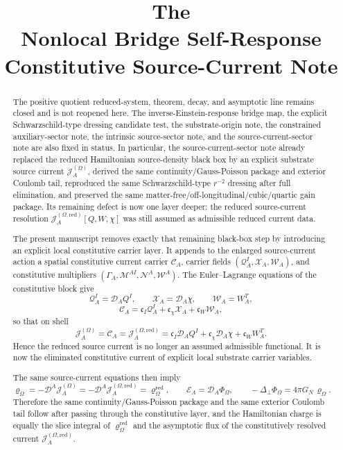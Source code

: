 \documentclass[11pt]{article}
\title{\textbf{The \TheoryName{}}\\[0.4em]
\large Nonlocal Bridge Self-Response Constitutive Source-Current Note}
\author{}
\date{}
\newcommand{\SpatialD}{\mathcal D}
\newcommand{\LapPerp}{\Delta_\perp}
\newcommand{\FlowPot}{\Phi_\Omega}
\newcommand{\SourceDensity}{\varrho_\Omega}
\newcommand{\SourceDensityRed}{\varrho_\Omega^{\mathrm{red}}}
\newcommand{\SourceCurrent}{\mathcal J^{(\Omega)}}
\newcommand{\SourceCurrentRed}{\mathcal J^{(\Omega,\mathrm{red})}}
\newcommand{\ConstCurrent}{\mathcal C}
\newcommand{\QCarrier}{\mathcal Q}
\newcommand{\ChiCarrier}{\mathcal X}
\newcommand{\TransCarrier}{\mathcal W}
\newcommand{\ConstGamma}{\Gamma}
\newcommand{\QMult}{\mathscr M}
\newcommand{\ChiMult}{\mathscr N}
\newcommand{\TransMult}{\mathscr W}
\newcommand{\SourceFlux}{\mathcal E}
\begin{document}
\maketitle

\begin{abstract}
The positive quotient reduced-system, theorem, decay, and asymptotic line remains closed and is not reopened here. The inverse-Einstein-response bridge map, the explicit Schwarzschild-type dressing candidate test, the substrate-origin note, the constrained auxiliary-sector note, the intrinsic source-sector note, and the source-current-sector note are also fixed in status. In particular, the source-current-sector note already replaced the reduced Hamiltonian source-density black box by an explicit substrate source current \(\SourceCurrent_A\), derived the same continuity/Gauss-Poisson package and exterior Coulomb tail, reproduced the same Schwarzschild-type \(r^{-2}\) dressing after full elimination, and preserved the same matter-free/off-longitudinal/cubic/quartic gain package. Its remaining defect is now one layer deeper: the reduced source-current resolution \(\SourceCurrentRed_A[Q,W,\chi]\) was still assumed as admissible reduced current data.

The present manuscript removes exactly that remaining black-box step by introducing an explicit local constitutive carrier layer. It appends to the enlarged source-current action a spatial constitutive current carrier \(\ConstCurrent_A\), carrier fields \((\QCarrier^I_A,\ChiCarrier_A,\TransCarrier_A)\), and constitutive multipliers \((\ConstGamma_A,\QMult^{AI},\ChiMult^A,\TransMult^A)\). The Euler--Lagrange equations of the constitutive block give
\[
\QCarrier^I_A=\SpatialD_AQ^I,
\qquad
\ChiCarrier_A=\SpatialD_A\chi,
\qquad
\TransCarrier_A=W_A^T,
\]
\[
\ConstCurrent_A
=
\mathfrak c_I\QCarrier^I_A
+\mathfrak c_\chi\ChiCarrier_A
+\mathfrak c_W\TransCarrier_A,
\]
so that on shell
\[
\SourceCurrent_A
=
\ConstCurrent_A
=
\SourceCurrentRed_A
=
\mathfrak c_I\SpatialD_AQ^I
+\mathfrak c_\chi\SpatialD_A\chi
+\mathfrak c_WW_A^T.
\]
Hence the reduced source current is no longer an assumed admissible functional. It is now the eliminated constitutive current of explicit local substrate carrier variables.

The same source-current equations then imply
\[
\SourceDensity
=
-\SpatialD^A\SourceCurrent_A
=
-\SpatialD^A\SourceCurrentRed_A
=
\SourceDensityRed,
\qquad
\SourceFlux_A=\SpatialD_A\FlowPot,
\qquad
-\LapPerp\FlowPot=4\pi G_N\,\SourceDensity.
\]
Therefore the same continuity/Gauss-Poisson package and the same exterior Coulomb tail follow after passing through the constitutive layer, and the Hamiltonian charge is equally the slice integral of \(\SourceDensityRed\) and the asymptotic flux of the constitutively resolved current \(\SourceCurrentRed_A\).


\end{abstract}
\end{document}
